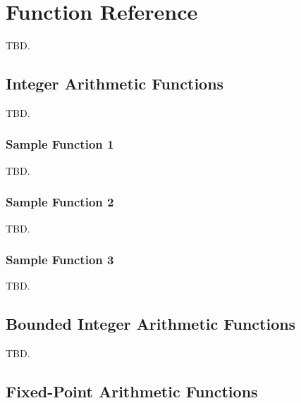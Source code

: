 \chapter{Function Reference}
\label{cfrf2}

TBD.

\section{Integer Arithmetic Functions}
\label{cfrf2:siaf2}

TBD.

\subsection{Sample Function 1}
\label{cfrf2:siaf2:ssfu1}

TBD.

\subsection{Sample Function 2}
\label{cfrf2:siaf2:ssfu2}

TBD.

\subsection{Sample Function 3}
\label{cfrf2:siaf2:ssfu3}

TBD.

\section{Bounded Integer Arithmetic Functions}
\label{cfrf2:sbai2}

TBD.

\section{Fixed-Point Arithmetic Functions}
\label{cfrf2:sfpa2}


